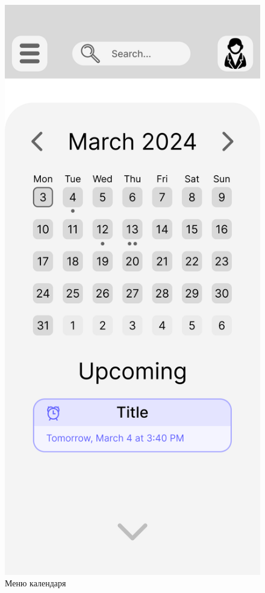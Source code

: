 \documentclass[oneside,14pt]{extarticle}
\begin{document}
\begin{normalsize}
\begin{figure}[H]
\begin{minipage}{0.48\textwidth}
		\end{minipage}\hfill
		\begin{minipage}{0.48\textwidth}
			\centering
			\includegraphics[scale=0.13]{Frame 4}
			\caption{Меню календаря}
		\end{minipage}
	\end{figure}
	

\end{normalsize}
\end{document}
